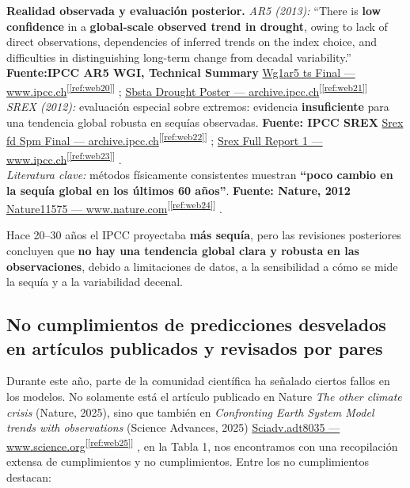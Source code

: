 \documentclass[
  10pt,
  a4paper,
  DIV=11,
  numbers=noendperiod,
  open=any]{scrreprt}
\numberwithin{equation}{chapter}
\numberwithin{equation}{section}
\renewcommand{\[}{\begin{equation}}
\renewcommand{\]}{\end{equation}}
\newcommand{\refweb}[3]{%
  \href{#1}{#2}\textsuperscript{[\ref{ref:#3}]}%
}
\begin{document}
\medskip

\textbf{Realidad observada y evaluación posterior.}
\emph{AR5 (2013):} “There is \textbf{low confidence} in a \textbf{global-scale observed trend in drought}, owing to lack of direct observations, dependencies of inferred trends on the index choice, and difficulties in distinguishing long-term change from decadal variability.”
\textbf{Fuente:IPCC AR5 WGI, Technical Summary} \refweb{https://www.ipcc.ch/site/assets/uploads/2018/02/WG1AR5_TS_FINAL.pdf}{Wg1ar5 ts Final — www.ipcc.ch}{web20}; \refweb{https://archive.ipcc.ch/news_and_events/docs/SBSTA-44/Sbsta_drought_poster.pdf}{Sbsta Drought Poster — archive.ipcc.ch}{web21}\\
\emph{SREX (2012):} evaluación especial sobre extremos: evidencia \textbf{insuficiente} para una tendencia global robusta en sequías observadas.
\textbf{Fuente: IPCC SREX} \refweb{https://archive.ipcc.ch/pdf/special-reports/srex/SREX_FD_SPM_final.pdf}{Srex fd Spm Final — archive.ipcc.ch}{web22}; \refweb{https://www.ipcc.ch/site/assets/uploads/2018/03/SREX_Full_Report-1.pdf}{Srex Full Report 1 — www.ipcc.ch}{web23}.\\
\emph{Literatura clave:} métodos físicamente consistentes muestran \textbf{“poco cambio en la sequía global en los últimos 60 años”}.
\textbf{Fuente: Nature, 2012} \refweb{https://www.nature.com/articles/nature11575}{Nature11575 — www.nature.com}{web24}.\\

\medskip

Hace 20--30 años el IPCC proyectaba \textbf{más sequía}, pero las revisiones posteriores concluyen que \textbf{no hay una tendencia global clara y robusta en las observaciones}, debido a limitaciones de datos, a la sensibilidad a cómo se mide la sequía y a la variabilidad decenal. 


\subsection{No cumplimientos de predicciones desvelados en artículos publicados y revisados por pares}

Durante este año, parte de la comunidad científica ha señalado ciertos fallos en los modelos. No solamente está el artículo publicado en Nature \textit{The other climate crisis} (Nature, 2025), sino que también en \textit{Confronting Earth System Model trends with observations} (Science Advances, 2025) \refweb{https://www.science.org/doi/10.1126/sciadv.adt8035}{Sciadv.adt8035 — www.science.org}{web25}, en la Tabla 1, nos encontramos con una recopilación extensa de cumplimientos y no cumplimientos. Entre los no cumplimientos destacan:
\end{document}
